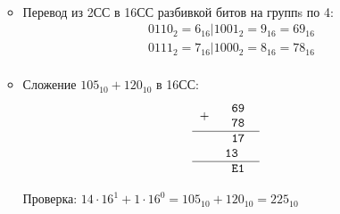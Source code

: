 \documentclass[oneside,a4paper,14pt]{extarticle} %
\begin{document}
\begin{enumerate}
\begin{itemize}
$$\begin{array}{cc}
                        \end{array}
                    $$
                \item Перевод из 2СС в 16СС разбивкой битов на группs по 4:
                    $$
                        \begin{array}{cc}
                            & 0110_{2} = 6_{16} | 1001_{2} = 9_{16} = 69_{16}\\
                            & 0111_{2} = 7_{16} | 1000_{2} = 8_{16} = 78_{16}\\
                        \end{array}
                    $$
                \item Сложение $105_{10} + 120_{10}$ в 16СС:
                    $$    
                        \begin{tabular}{{c}{c}}
                        \texttt{$+$ }&
                        \begin{tabular}{c}
                        \texttt{69}\\
                        \texttt{78}\\
                        \end{tabular} \\ 
                        \hline
                        & \texttt{17}\\
                        & \texttt{13~~~}\\
                        \hline
                        & \texttt{E1} \\
                        \end{tabular}
                    $$

                Проверка: $14 \cdot 16^1 + 1 \cdot 16^0 = 105_{10} + 120_{10} = 225_{10}$


\end{itemize}
\end{enumerate}
\end{document}
